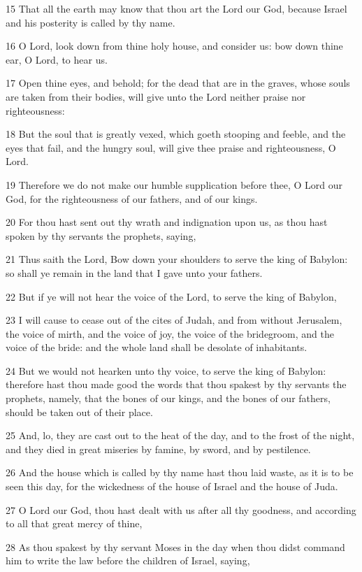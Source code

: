 \par 15 That all the earth may know that thou art the Lord our God, because Israel and his posterity is called by thy name.
\par 16 O Lord, look down from thine holy house, and consider us: bow down thine ear, O Lord, to hear us.
\par 17 Open thine eyes, and behold; for the dead that are in the graves, whose souls are taken from their bodies, will give unto the Lord neither praise nor righteousness:
\par 18 But the soul that is greatly vexed, which goeth stooping and feeble, and the eyes that fail, and the hungry soul, will give thee praise and righteousness, O Lord.
\par 19 Therefore we do not make our humble supplication before thee, O Lord our God, for the righteousness of our fathers, and of our kings.
\par 20 For thou hast sent out thy wrath and indignation upon us, as thou hast spoken by thy servants the prophets, saying,
\par 21 Thus saith the Lord, Bow down your shoulders to serve the king of Babylon: so shall ye remain in the land that I gave unto your fathers.
\par 22 But if ye will not hear the voice of the Lord, to serve the king of Babylon,
\par 23 I will cause to cease out of the cites of Judah, and from without Jerusalem, the voice of mirth, and the voice of joy, the voice of the bridegroom, and the voice of the bride: and the whole land shall be desolate of inhabitants.
\par 24 But we would not hearken unto thy voice, to serve the king of Babylon: therefore hast thou made good the words that thou spakest by thy servants the prophets, namely, that the bones of our kings, and the bones of our fathers, should be taken out of their place.
\par 25 And, lo, they are cast out to the heat of the day, and to the frost of the night, and they died in great miseries by famine, by sword, and by pestilence.
\par 26 And the house which is called by thy name hast thou laid waste, as it is to be seen this day, for the wickedness of the house of Israel and the house of Juda.
\par 27 O Lord our God, thou hast dealt with us after all thy goodness, and according to all that great mercy of thine,
\par 28 As thou spakest by thy servant Moses in the day when thou didst command him to write the law before the children of Israel, saying,
